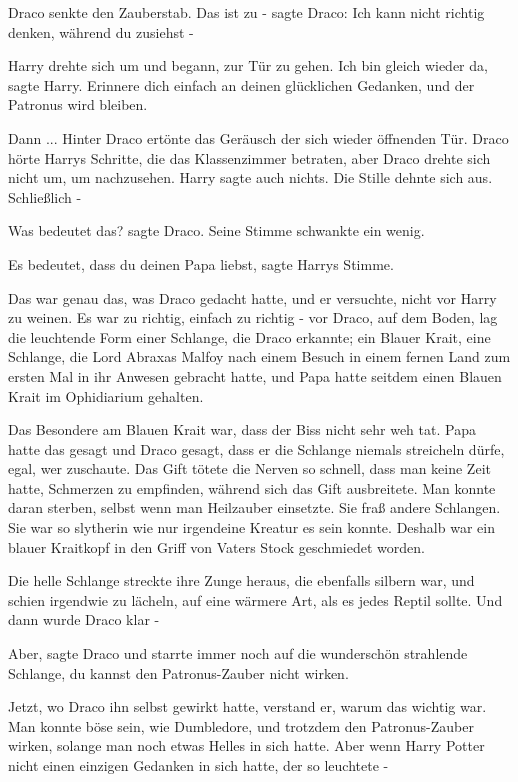 Draco senkte den Zauberstab. \glqq{}Das ist zu -\grqq{} sagte Draco: \glqq{}Ich
kann nicht richtig denken, während du zusiehst -\grqq{}

Harry drehte sich um und begann, zur Tür zu gehen. \glqq{}Ich bin gleich wieder
da\grqq{}, sagte Harry. \glqq{}Erinnere dich einfach an deinen glücklichen
Gedanken, und der Patronus wird bleiben.\grqq{}

Dann ... Hinter Draco ertönte das Geräusch der sich wieder öffnenden Tür. Draco
hörte Harrys Schritte, die das Klassenzimmer betraten, aber Draco drehte sich
nicht um, um nachzusehen. Harry sagte auch nichts. Die Stille dehnte sich aus.
Schließlich -

\glqq{}Was bedeutet das?\grqq{} sagte Draco. Seine Stimme schwankte ein wenig.

\glqq{}Es bedeutet, dass du deinen Papa liebst\grqq{}, sagte Harrys Stimme.

Das war genau das, was Draco gedacht hatte, und er versuchte, nicht vor Harry zu
weinen. Es war zu richtig, einfach zu richtig - vor Draco, auf dem Boden, lag
die leuchtende Form einer Schlange, die Draco erkannte; ein Blauer Krait, eine
Schlange, die Lord Abraxas Malfoy nach einem Besuch in einem fernen Land zum
ersten Mal in ihr Anwesen gebracht hatte, und Papa hatte seitdem einen Blauen
Krait im Ophidiarium gehalten.

Das Besondere am Blauen Krait war, dass der Biss nicht sehr weh tat. Papa hatte
das gesagt und Draco gesagt, dass er die Schlange niemals streicheln dürfe,
egal, wer zuschaute. Das Gift tötete die Nerven so schnell, dass man keine Zeit
hatte, Schmerzen zu empfinden, während sich das Gift ausbreitete. Man konnte
daran sterben, selbst wenn man Heilzauber einsetzte. Sie fraß andere Schlangen.
Sie war so slytherin wie nur irgendeine Kreatur es sein konnte. Deshalb war ein
blauer Kraitkopf in den Griff von Vaters Stock geschmiedet worden.

Die helle Schlange streckte ihre Zunge heraus, die ebenfalls silbern war, und
schien irgendwie zu lächeln, auf eine wärmere Art, als es jedes Reptil sollte.
Und dann wurde Draco klar -

\glqq{}Aber\grqq{}, sagte Draco und starrte immer noch auf die wunderschön
strahlende Schlange, \glqq{}du kannst den Patronus-Zauber nicht wirken.\grqq{}

Jetzt, wo Draco ihn selbst gewirkt hatte, verstand er, warum das wichtig war.
Man konnte böse sein, wie Dumbledore, und trotzdem den Patronus-Zauber wirken,
solange man noch etwas Helles in sich hatte. Aber wenn Harry Potter nicht einen
einzigen Gedanken in sich hatte, der so leuchtete -

